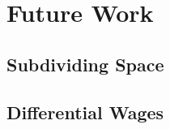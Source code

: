 \chapter[Future Work]{Future Work}
\label{AppendixA}
\section{Subdividing Space}

\section{Differential Wages}
